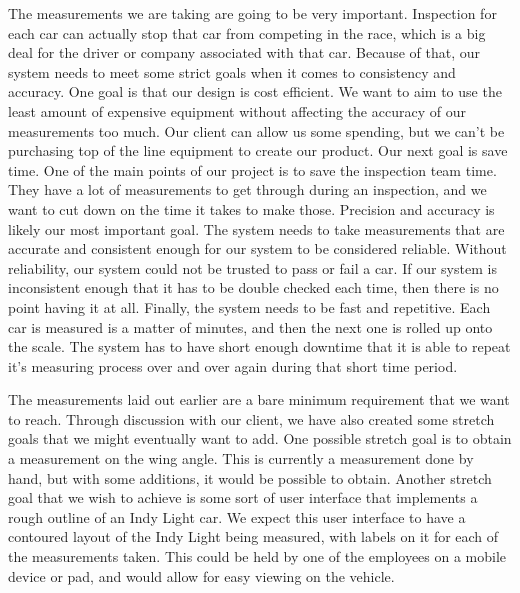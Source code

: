 \documentclass[onecolumn, draftclsnofoot,10pt, compsoc]{IEEEtran}
\begin{document}
\noindent The measurements we are taking are going to be very important.  Inspection for each car can actually stop that car from competing in the race, which is a big deal for the driver or company associated with that car.  Because of that, our system needs to meet some strict goals when it comes to consistency and accuracy.  One goal is that our design is cost efficient.  We want to aim to use the least amount of expensive equipment without affecting the accuracy of our measurements too much.  Our client can allow us some spending, but we can’t be purchasing top of the line equipment to create our product.  Our next goal is save time.  One of the main points of our project is to save the inspection team time.  They have a lot of measurements to get through during an inspection, and we want to cut down on the time it takes to make those.  Precision and accuracy is likely our most important goal.  The system needs to take measurements that are accurate and consistent enough for our system to be considered reliable.  Without reliability, our system could not be trusted to pass or fail a car.  If our system is inconsistent enough that it has to be double checked each time, then there is no point having it at all.  Finally, the system needs to be fast and repetitive.  Each car is measured is a matter of minutes, and then the next one is rolled up onto the scale.  The system has to have short enough downtime that it is able to repeat it’s measuring process over and over again during that short time period.

\newline

\noindent The measurements laid out earlier are a bare minimum requirement that we want to reach.  Through discussion with our client, we have also created some stretch goals that we might eventually want to add.  One possible stretch goal is to obtain a measurement on the wing angle.  This is currently a measurement done by hand, but with some additions, it would be possible to obtain.  Another stretch goal that we wish to achieve is some sort of user interface that implements a rough outline of an Indy Light car.  We expect this user interface to have a contoured layout of the Indy Light being measured, with labels on it for each of the measurements taken.  This could be held by one of the employees on a mobile device or pad, and would allow for easy viewing on the vehicle.
\end{document}
